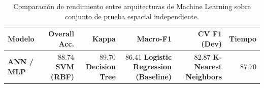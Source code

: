 \begin{table}[htbp]
    \centering
    \caption{Comparación de rendimiento entre arquitecturas de Machine Learning sobre conjunto de prueba espacial independiente.}
    \label{tab:model_comparison}
    \small
    \begin{tabular}{lrrrrr}
        \toprule
        \textbf{Modelo} & \textbf{Overall Acc.} & \textbf{Kappa} & \textbf{Macro-F1} & \textbf{CV F1 (Dev)} & \textbf{Tiempo} \\
        \midrule
        \textbf{ANN / MLP} & 88.74%
        \textbf{SVM (RBF)} & 89.70%
        \textbf{Decision Tree} & 86.41%
        \textbf{Logistic Regression (Baseline)} & 82.87%
        \textbf{K-Nearest Neighbors} & 87.70%
        \bottomrule
    \end{tabular}
\end{table}
